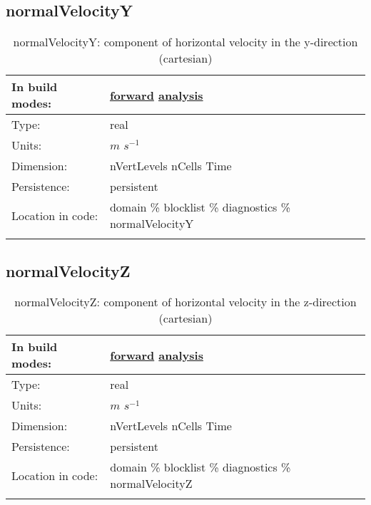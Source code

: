 \subsection[normalVelocityY]{normalVelocityY}
\label{subsec:var_sec_diagnostics_normalVelocityY}
\begin{center}
\begin{longtable}{| p{2.0in} | p{4.0in} |}
        \hline 
        In build modes: & \hyperref[subsec:forward_var_tab_diagnostics]{forward} \hyperref[subsec:analysis_var_tab_diagnostics]{analysis} \\
        \hline 
        Type: & real \\
        \hline 
        Units: & $m$ $s^{-1}$ \\
        \hline 
        Dimension: & nVertLevels nCells Time \\
        \hline 
        Persistence: & persistent \\
        \hline 
		 Location in code: & domain \% blocklist \% diagnostics \% normalVelocityY \\
		 \hline 
    \caption{normalVelocityY: component of horizontal velocity in the y-direction (cartesian)}
\end{longtable}
\end{center}
\subsection[normalVelocityZ]{normalVelocityZ}
\label{subsec:var_sec_diagnostics_normalVelocityZ}
\begin{center}
\begin{longtable}{| p{2.0in} | p{4.0in} |}
        \hline 
        In build modes: & \hyperref[subsec:forward_var_tab_diagnostics]{forward} \hyperref[subsec:analysis_var_tab_diagnostics]{analysis} \\
        \hline 
        Type: & real \\
        \hline 
        Units: & $m$ $s^{-1}$ \\
        \hline 
        Dimension: & nVertLevels nCells Time \\
        \hline 
        Persistence: & persistent \\
        \hline 
		 Location in code: & domain \% blocklist \% diagnostics \% normalVelocityZ \\
		 \hline 
    \caption{normalVelocityZ: component of horizontal velocity in the z-direction (cartesian)}
\end{longtable}
\end{center}
